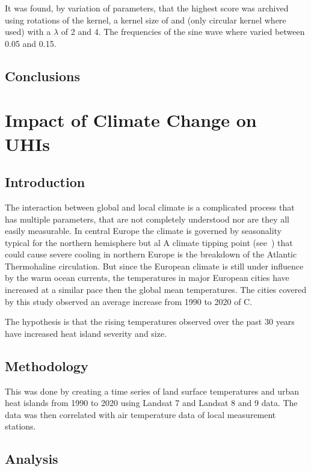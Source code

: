 \documentclass[a4paper, english]{article}
\begin{document}
    It was found, by variation of parameters, that the highest score was archived using 
    rotations of the kernel, a kernel size of 
    and (only circular kernel where used) with a $\lambda$ of 2 and 4. %
    The frequencies of the sine wave where varied between 0.05 and 0.15. 


    \subsection{Conclusions}
    

\section{Impact of Climate Change on UHIs}
    \subsection{Introduction}
    The interaction between global and local climate is a complicated process that has multiple parameters, that are not completely understood nor are they all easily measurable. 
    In central Europe the climate is governed by seasonality typical for the northern hemisphere but al
    A climate tipping point (see~\cite{Lenton2008}) that could cause severe cooling in northern Europe is the breakdown of the Atlantic Thermohaline circulation\cite{Rahmstorf1999}.
    But since the European climate is still under influence by the warm ocean currents, the temperatures in major European cities have increased at a similar pace then the global mean temperatures. 
    The cities covered by this study observed an average increase from 1990 to 2020 of %
    \textdegree C. 



%
    The hypothesis is that the rising temperatures observed over the past 30 years have increased heat island severity and size. 
    \subsection{Methodology}
    This was done by creating a time series of land surface temperatures and urban heat islands from 1990 to 2020 using Landsat 7 and Landsat 8 and 9 data. 
    The data was then correlated with air temperature data of local measurement stations. 


    \subsection{Analysis}
\end{document}
